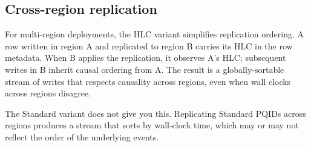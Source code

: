 \subsection{Cross-region replication}

For multi-region deployments, the HLC variant simplifies replication ordering. A row written in region A and replicated to region B carries its HLC in the row metadata. When B applies the replication, it observes A's HLC; subsequent writes in B inherit causal ordering from A. The result is a globally-sortable stream of writes that respects causality across regions, even when wall clocks across regions disagree.

The Standard variant does not give you this. Replicating Standard PQIDs across regions produces a stream that sorts by wall-clock time, which may or may not reflect the order of the underlying events.

